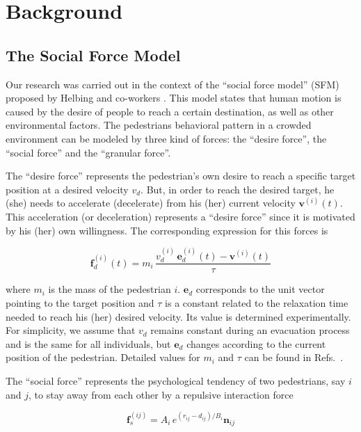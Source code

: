 \section{\label{background}Background}

\subsection{\label{sfm}The Social Force Model}

Our research was carried out in the context of the ``social force model'' (SFM) 
proposed by Helbing and co-workers \cite{Helbing1}. This model states that human 
motion is caused by the desire of people to reach a certain destination, as 
well as other environmental factors. The pedestrians behavioral pattern in a 
crowded environment can be modeled by three kind of forces: the ``desire 
force'', the ``social force'' and the ``granular force''.

The ``desire force'' represents the pedestrian's own desire to reach a 
specific target position at a desired velocity $v_d$. But, in order to reach 
the desired target, he (she) needs to accelerate (decelerate) from his (her) 
current velocity $\mathbf{v}^{(i)}(t)$. This acceleration (or deceleration) 
represents a ``desire force'' since it is motivated by his (her) own 
willingness. The corresponding expression for this forces is 

\begin{equation}
        \mathbf{f}_d^ {(i)}(t) =  
m_i\,\displaystyle\frac{v_d^{(i)}\,\mathbf{e}_d^
{(i)}(t)-\mathbf{v}^{(i)}(t)}{\tau} \label{desired}
\end{equation}

where $m_i$ is the mass of the pedestrian $i$. $\mathbf{e}_d$ 
corresponds to the unit vector pointing to the target position and $\tau$ is a 
constant related to the relaxation time needed to reach his (her) desired 
velocity. Its value is determined experimentally. For simplicity, we assume that 
$v_d$ remains constant during an evacuation process and is the same for all 
individuals, but $\mathbf{e}_d$ changes according to the current position of the 
pedestrian. Detailed values for $m_i$ and $\tau$ can be found in 
Refs.~\cite{Helbing1,Dorso3}. 

The ``social force'' represents the psychological tendency of two pedestrians,  
say $i$ and $j$, to stay away from each other by a repulsive interaction force 

\begin{equation}
        \mathbf{f}_s^{(ij)} = A_i\,e^{(r_{ij}-d_{ij})/B_i}\mathbf{n}_{ij} 
        \label{social}
\end{equation}

